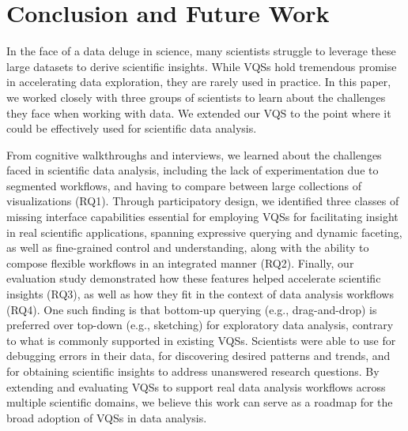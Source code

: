 \section{Conclusion and Future Work \label{conclusion}} 
\par In the face of a data deluge in science, many scientists struggle to leverage these large datasets to derive scientific insights. While VQSs hold tremendous promise in accelerating data exploration, they are rarely used in practice. In this paper, we worked closely with three groups of scientists to learn about the challenges they face when working with data. We extended our VQS \zv to the point where it could be effectively used for scientific data analysis. 
\par From cognitive walkthroughs and interviews, we learned about the challenges faced in scientific data analysis, including the lack of experimentation due to segmented workflows, and having to compare between large collections of visualizations (RQ1). Through participatory design, we identified three classes of missing interface capabilities  essential for employing VQSs for facilitating insight in real scientific applications, spanning expressive querying and dynamic faceting, as well as fine-grained control and understanding, along with the ability to compose flexible workflows in an integrated manner (RQ2). Finally, our evaluation study demonstrated how these features helped accelerate scientific insights (RQ3), as well as how they fit in the context of data analysis workflows (RQ4). One such finding is that bottom-up querying (e.g., drag-and-drop) is preferred over top-down (e.g., sketching) for exploratory data analysis, contrary to what is commonly supported in existing VQSs. Scientists were able to use \zv for debugging errors in their data, for discovering desired patterns and trends, and for obtaining scientific insights to address unanswered research questions. By extending and evaluating VQSs to support real data analysis workflows across multiple scientific domains, we believe this work can serve as a roadmap for the broad adoption of VQSs in data analysis.

